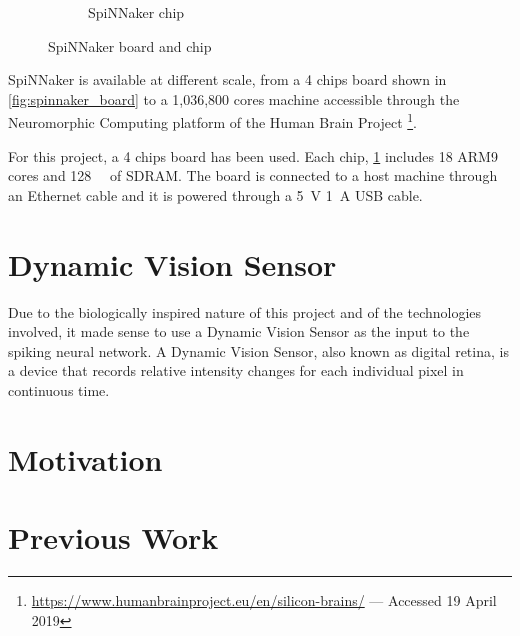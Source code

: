\begin{figure}[ht]
\begin{subfigure}{0.45\textwidth}
\caption{SpiNNaker chip}
\label{fig:spinnaker_chip}
\end{subfigure}
\caption[SpiNNaker Board and Chip]{SpiNNaker board and chip}
\label{fig:spinnaker}
\end{figure}

SpiNNaker is available at different scale, from a 4 chips board shown in \cref{fig:spinnaker_board} to a 1,036,800 cores machine accessible through the Neuromorphic Computing platform of the Human Brain Project \footnote{\url{https://www.humanbrainproject.eu/en/silicon-brains/} --- Accessed 19 April 2019}.

For this project, a 4 chips board has been used. Each chip, \cref{fig:spinnaker_chip} includes 18 ARM9 cores and \SI{128}{\mega\byte} of SDRAM. The board is connected to a host machine through an Ethernet cable and it is powered through a \SI{5}{\volt} \SI{1}{\ampere} USB cable.


\section{Dynamic Vision Sensor}
Due to the biologically inspired nature of this project and of the technologies involved, it made sense to use a Dynamic Vision Sensor as the input to the spiking neural network. A Dynamic Vision Sensor, also known as digital retina, is a device that records relative intensity changes for each individual pixel in continuous time.

\section{Motivation}


\section{Previous Work}
